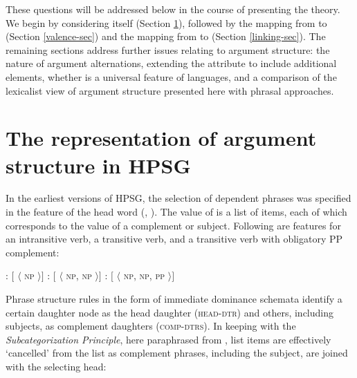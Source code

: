 \documentclass[output=paper
                ,modfonts
                ,nonflat
	        ,collection
	        ,collectionchapter
	        ,collectiontoclongg
 	        ,biblatex
                ,babelshorthands
                ,newtxmath
                ,draftmode
                ,colorlinks, citecolor=brown
]{./langsci/langscibook}
\begin{document}
\noindent
These questions will be addressed below in the course of presenting the theory.  We begin by considering \argst itself (Section \ref{sec:arg-st}), followed by the mapping from \argst to \val (Section \ref{valence-sec}) and the mapping from \content to \argst (Section \ref{linking-sec}).  
The remaining sections address further issues relating to argument structure: the nature of argument alternations, extending the \argst attribute to include additional elements, whether \argst is a universal feature of languages, and a comparison of the lexicalist view of argument structure presented here with phrasal approaches.


\section{The representation of argument structure in HPSG}

\label{sec:arg-st}

In the earliest versions of HPSG, the selection of dependent phrases was specified in the \subcat feature  of the head word (\citealt{pollard+sag:1987}, \citealt[Chapter~1--8]{pollard+sag:1994}).  The value of \subcat is a list of items, each of which corresponds to the \synsem value of a complement or subject.  Following are \subcat features for an intransitive verb, a transitive verb, and a transitive verb with obligatory PP complement:


\begin{exe} 
\ex \label{subcats}
\begin{xlist}
\ex	{}:  $[$ \subcat $\langle$ \textsc{np} $\rangle ]$
\ex    {}:  $[$ \subcat $\langle$ \textsc{np}, \textsc{np} $\rangle ]$
\ex    {}:  $[$ \subcat $\langle$ \textsc{np}, \textsc{np}, \textsc{pp} $\rangle ]$
\end{xlist}
\end{exe}

\noindent
Phrase structure rules in the form of immediate dominance schemata  identify a certain daughter node as the head daughter (\textsc{head-dtr}) and others, including subjects, as complement daughters (\textsc{comp-dtrs}).  In keeping with the \emph{Subcategorization Principle},  here paraphrased from \cite[34]{pollard+sag:1994}, list items are effectively ‘cancelled’ from the \subcat list as complement phrases, including the subject, are joined with the selecting head:
\end{document}
